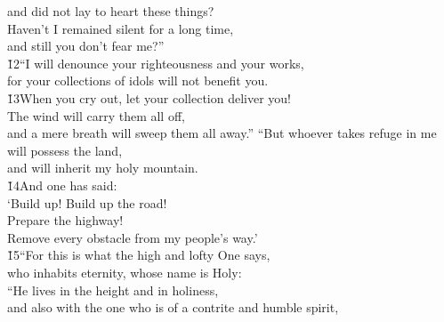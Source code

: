 \begin{poetry}
\poemlll       and did not lay to heart these things? \\
\poeml Haven't I remained silent for a long time, \\
\poemll    and still you don't fear me?'' \\
\poeml \v{12}``I will denounce your righteousness and your works, \\
\poemll    for your collections of idols will not benefit you. \\
\poeml \v{13}When you cry out, let your collection deliver you! \\
\poemll    The wind will carry them all off, \\
\poemlll       and a mere breath will sweep them all away.''
\poeml ``But whoever takes refuge in me will possess the land, \\
\poemll    and will inherit my holy mountain. \\
\poeml \v{14}And one has said: \\
\poemll    `Build up! Build up the road! \\
\poemlll       Prepare the highway! \\
\poeml Remove every obstacle from my people's way.' \\
\poeml \v{15}``For this is what the high and lofty One says, \\
\poemll    who inhabits eternity, whose name is Holy: \\
\poeml ``He lives in the height and in holiness, \\
\poemll    and also with the one who is of a contrite and humble spirit, \\

\end{poetry}

